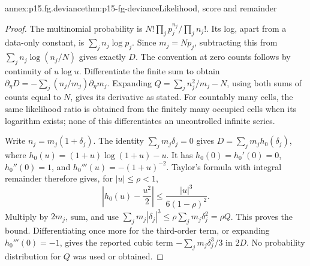 \begin{annexitem}{annex:p15.fg.deviance}{thm:p15-fg-deviance}{Likelihood, score and remainder}
\begin{proof}
The multinomial probability is
\(N!\prod_jp_j^{n_j}/\prod_jn_j!\). Its log, apart from a
data-only constant, is \(\sum_jn_j\log p_j\). Since
\(m_j=Np_j\), subtracting this from
\(\sum_jn_j\log(n_j/N)\) gives exactly \(D\).
The convention at zero counts follows by continuity of \(u\log u\).
Differentiate the finite sum to obtain
\(\partial_\eta D=-\sum_j(n_j/m_j)\partial_\eta m_j\).
Expanding \(Q=\sum_jn_j^2/m_j-N\), using both sums of counts
equal to \(N\), gives its derivative as stated. For countably many
cells, the same likelihood ratio is obtained from the finitely many
occupied cells when its logarithm exists; none of this differentiates an
uncontrolled infinite series.

Write \(n_j=m_j(1+\delta_j)\). The identity
\(\sum_jm_j\delta_j=0\) gives
\(D=\sum_jm_j h_0(\delta_j)\), where
\(h_0(u)=(1+u)\log(1+u)-u\). It has
\(h_0(0)=h_0'(0)=0\), \(h_0''(0)=1\), and
\(h_0'''(u)=-(1+u)^{-2}\). Taylor's formula with integral
remainder therefore gives, for \(|u|\leq\rho<1\),
\[
 \left|h_0(u)-\frac{u^2}{2}\right|
 \leq\frac{|u|^3}{6(1-\rho)^2}.
\]
Multiply by \(2m_j\), sum, and use
\(\sum_jm_j|\delta_j|^3\leq\rho\sum_jm_j\delta_j^2=\rho Q\).
This proves the bound. Differentiating once more for the third-order
term, or expanding \(h_0'''(0)=-1\), gives the reported cubic term
\(-\sum_jm_j\delta_j^3/3\) in \(2D\). No probability distribution
for \(Q\) was used or obtained.
\end{proof}
\end{annexitem}

